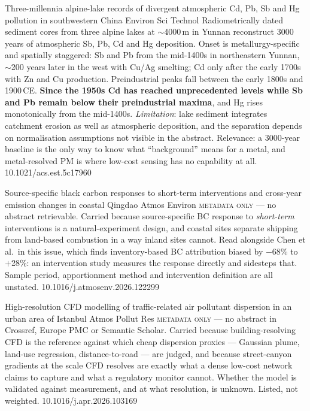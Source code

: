 \documentclass[10pt]{article}
\begin{document}
{Three-millennia alpine-lake records of divergent atmospheric Cd, Pb, Sb and Hg pollution
in southwestern China}
{Environ Sci Technol}
{Radiometrically dated sediment cores from three alpine lakes at $\sim$4000\,m in Yunnan
reconstruct 3000 years of atmospheric Sb, Pb, Cd and Hg deposition. Onset is
metallurgy-specific and spatially staggered: Sb and Pb from the mid-1400s in northeastern
Yunnan, $\sim$200 years later in the west with Cu/Ag smelting; Cd only after the early
1700s with Zn and Cu production. Preindustrial peaks fall between the early 1800s and
1900\,CE. \textbf{Since the 1950s Cd has reached unprecedented levels while Sb and Pb
remain below their preindustrial maxima}, and Hg rises monotonically from the mid-1400s.
\emph{Limitation}: lake sediment integrates catchment erosion as well as atmospheric
deposition, and the separation depends on normalisation assumptions not visible in the
abstract. Relevance: a 3000-year baseline is the only way to know what ``background''
means for a metal, and metal-resolved PM is where low-cost sensing has no capability at
all.}
{10.1021/acs.est.5c17960}

{Source-specific black carbon responses to short-term interventions and cross-year
emission changes in coastal Qingdao}
{Atmos Environ}
{\textsc{metadata only} --- no abstract retrievable. Carried because source-specific BC
response to \emph{short-term} interventions is a natural-experiment design, and coastal
sites separate shipping from land-based combustion in a way inland sites cannot. Read
alongside Chen et al.\ in this issue, which finds inventory-based BC attribution biased by
$-$68\% to $+$28\%: an intervention study measures the response directly and sidesteps
that. Sample period, apportionment method and intervention definition are all unstated.}
{10.1016/j.atmosenv.2026.122299}

{High-resolution CFD modelling of traffic-related air pollutant dispersion in an urban
area of Istanbul}
{Atmos Pollut Res}
{\textsc{metadata only} --- no abstract in Crossref, Europe PMC or Semantic Scholar.
Carried because building-resolving CFD is the reference against which cheap dispersion
proxies --- Gaussian plume, land-use regression, distance-to-road --- are judged, and
because street-canyon gradients at the scale CFD resolves are exactly what a dense
low-cost network claims to capture and what a regulatory monitor cannot. Whether the model
is validated against measurement, and at what resolution, is unknown. Listed, not
weighted.}
{10.1016/j.apr.2026.103169}
\end{document}
